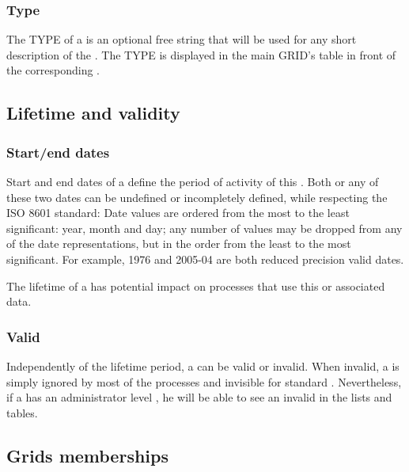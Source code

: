 \subsubsection{Type}

The TYPE of a  is an optional free string that will be used for any short description of the . The TYPE is displayed in the main GRID's table in front of the corresponding .


\subsection{Lifetime and validity}

\subsubsection{Start/end dates}

Start and end dates of a  define the period of activity of this . Both or any of these two dates can be undefined or incompletely defined, while respecting the ISO 8601 standard: Date values are ordered from the most to the least significant: year, month and day; any number of values may be dropped from any of the date representations, but in the order from the least to the most significant. For example, 1976 and 2005-04 are both reduced precision valid dates.

The lifetime of a  has potential impact on processes that use this  or associated data.


\subsubsection{Valid }

Independently of the lifetime period, a  can be valid or invalid. When invalid, a  is simply ignored by most of the \webobs processes and invisible for standard . Nevertheless, if a  has an administrator level , he will be able to see an invalid  in the lists and tables.



\subsection{Grids memberships}

